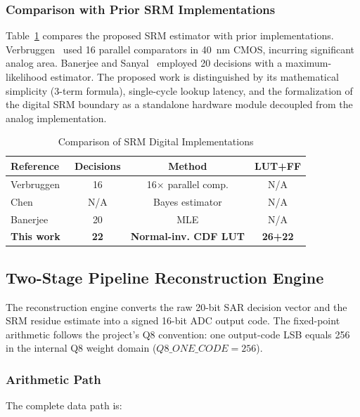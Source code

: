 \documentclass[journal]{IEEEtran}
\begin{document}
\subsubsection{Comparison with Prior SRM Implementations}

Table~\ref{tab:srm_comparison} compares the proposed SRM estimator with prior
implementations. Verbruggen~\cite{verbruggen_jssc_2015} used 16 parallel
comparators in 40~nm CMOS, incurring significant analog area. Banerjee and
Sanyal~\cite{banerjee_el_2017} employed 20 decisions with a maximum-likelihood
estimator. The proposed work is distinguished by its mathematical simplicity
(3-term formula), single-cycle lookup latency, and the formalization of the
digital SRM boundary as a standalone hardware module decoupled from the
analog implementation.

\begin{table}[!t]
\centering
\caption{Comparison of SRM Digital Implementations}
\label{tab:srm_comparison}
\begin{tabular}{lccc}
\toprule
Reference & Decisions & Method & LUT+FF \\
\midrule
Verbruggen~\cite{verbruggen_jssc_2015} & 16 & 16$\times$ parallel comp. & N/A \\
Chen~\cite{chen_jssc_2017} & N/A & Bayes estimator & N/A \\
Banerjee~\cite{banerjee_el_2017} & 20 & MLE & N/A \\
\textbf{This work} & \textbf{22} & \textbf{Normal-inv. CDF LUT} & \textbf{26+22} \\
\bottomrule
\end{tabular}
\end{table}

\subsection{Two-Stage Pipeline Reconstruction Engine}
\label{sec:recon}

The reconstruction engine converts the raw 20-bit SAR decision vector and the
SRM residue estimate into a signed 16-bit ADC output code. The fixed-point
arithmetic follows the project's Q8 convention: one output-code LSB equals 256
in the internal Q8 weight domain ($Q8\_ONE\_CODE = 256$).

\subsubsection{Arithmetic Path}

The complete data path is:
\end{document}
